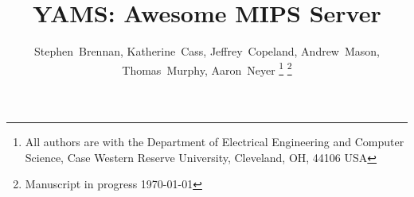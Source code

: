 \documentclass[journal,10pt]{IEEEtran}
\begin{document}
%
\title{YAMS: Awesome MIPS Server}

%
%
%

\author{
Stephen~Brennan,
Katherine~Cass,
Jeffrey~Copeland,
Andrew~Mason,
Thomas~Murphy,
Aaron~Neyer%
\thanks{All authors are with the Department of Electrical Engineering and Computer Science, Case Western Reserve University, Cleveland, OH, 44106 USA}%
\thanks{Manuscript in progress \today}
} %

% 
%



%
{}
\end{document}
